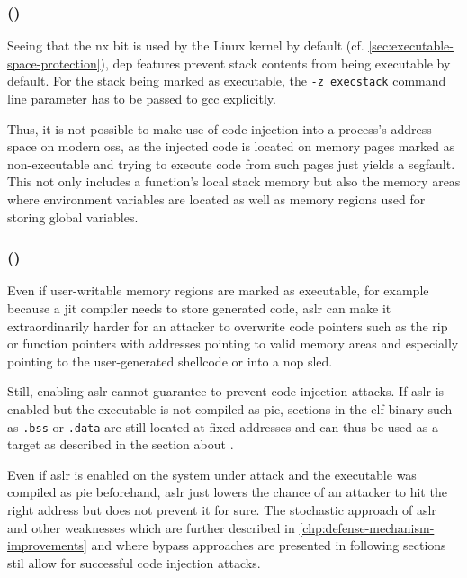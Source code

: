 \subsubsection{ ()}
\label{subsubsec:ci-data-execution-prevention}

Seeing that the \gls{nx} bit is used by the Linux kernel by default (cf. \cref{sec:executable-space-protection}), \gls{dep} features prevent stack contents from being executable by default.
For the stack being marked as executable, the \texttt{-z execstack} command line parameter has to be passed to \gls{gcc} explicitly.

Thus, it is not possible to make use of code injection into a process's address space on modern \glspl{os}, as the injected code is located on memory pages marked as non-executable and trying to execute code from such pages just yields a \gls{segfault}.
This not only includes a function's local stack memory but also the memory areas where environment variables are located as well as memory regions used for storing global variables.

\subsubsection{ ()}
\label{subsubsec:ci-aslr}

Even if user-writable memory regions are marked as executable, for example because a \gls{jit} compiler needs to store generated code, \gls{aslr} can make it extraordinarily harder for an attacker to overwrite code pointers such as the \gls{rip} or function pointers with addresses pointing to valid memory areas and especially pointing to the user-generated shellcode or into a \gls{nop} sled.

Still, enabling \gls{aslr} cannot guarantee to prevent code injection attacks.
If \gls{aslr} is enabled but the executable is not compiled as \gls{pie}, sections in the \gls{elf} binary such as \texttt{.bss} or \texttt{.data} are still located at fixed addresses and can thus be used as a target as described in the section about .

Even if \gls{aslr} is enabled on the system under attack and the executable was compiled as \gls{pie} beforehand, \gls{aslr} just lowers the chance of an attacker to hit the right address but does not prevent it for sure.
The stochastic approach of \gls{aslr} and other weaknesses which are further described in \cref{chp:defense-mechanism-improvements} and where bypass approaches are presented in following sections stil allow for successful code injection attacks.

